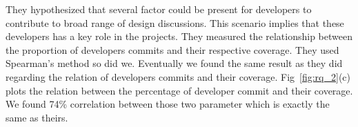 They hypothesized that several factor could be present for developers to contribute to broad range of design discussions. This scenario implies that these developers has a key role in the projects. They measured the relationship between the proportion of developers commits and their respective coverage. They used Spearman's method so did we. Eventually we found the same result as they did regarding the relation of developers commits and their coverage. Fig~\ref{fig:rq_2}(c) plots the relation between the percentage of developer commit and their coverage. We found 74\% correlation between those two parameter which is exactly the same as theirs.     
   